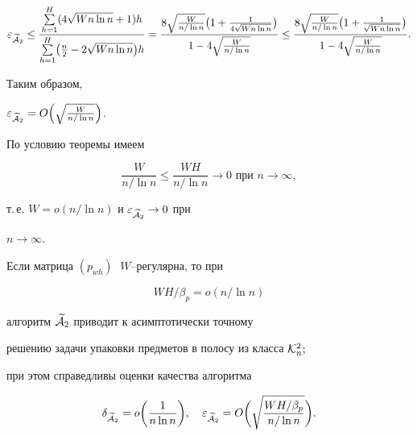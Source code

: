 \begin{pf}
$$


\eps_{\widetilde{\cal A}_{2}}\le


\frac{\SH (4\sqrt {Wn\ln n} +1)h}


{ \SH \bigl(\frac {n}{2}-2\sqrt {Wn\ln n}\bigr)h} =


\frac{8\sqrt {\frac {W}{n/\ln n}}


\bigl(1 +\frac {1}{4\sqrt {Wn\ln n}}\bigr)}


{1- 4 \sqrt {\frac {W}{n/\ln n}}} \le \\


\frac{8\sqrt {\frac {W}{n/\ln n}}


\bigl(1 +\frac {1}{\sqrt {Wn\ln n}}\bigr)}


{1- 4 \sqrt {\frac {W}{n/\ln n}}}.


$$





Таким образом, 


$\varepsilon_{\widetilde{\cal A}_{2}}=O\Bigl(\sqrt {\frac {W}{n/\ln n}} \Bigr)$.


По условию теоремы имеем


$$


\frac {W}{n/\ln n} \le \frac {WH}{n/\ln n}\to 0


\text{ при } n \to \infty,


$$


т.\,е. $W=o(n/\ln n)$ и $\varepsilon_{\widetilde{\cal A}_{2}}\to 0$ при


$n \to \infty$.


\end{pf}





\begin{thm}


\label{th2}


Если матрица $(p_{wh})\;$ $W$--регулярна, то при 


\begin{equation}


\label{e16}


WH/ \beta_{p} = o(n/ \ln n)


\end{equation}


алгоритм $ \widetilde {\cal A}_{2}$ приводит к асимптотически точному


решению задачи упаковки предметов в полосу из класса ${\cal K}_{n}^{2};$


при этом справедливы оценки качества алгоритма


$$


\delta_{\widetilde{\cal A}_{2}}=o\biggl(\frac {1}{n \ln n}\biggr),\quad


\eps_{\widetilde{\cal A}_{2}}=


O\biggl(\sqrt {\frac {WH/ \beta_{p}}{n/\ln n}} \biggr).


$$


\end{thm}





